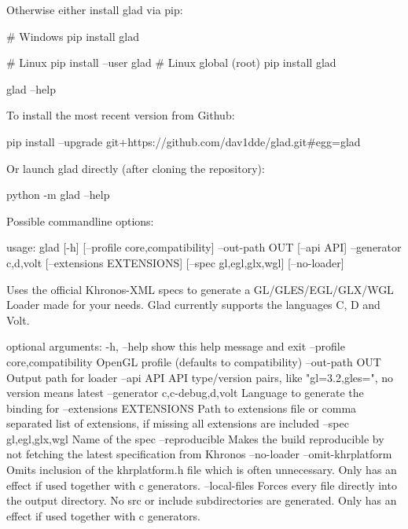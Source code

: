 Otherwise either install glad via pip\+: \begin{DoxyVerb}# Windows
pip install glad

# Linux
pip install --user glad
# Linux global (root)
pip install glad

glad --help
\end{DoxyVerb}


To install the most recent version from Github\+: \begin{DoxyVerb}pip install --upgrade git+https://github.com/dav1dde/glad.git#egg=glad
\end{DoxyVerb}


Or launch glad directly (after cloning the repository)\+: \begin{DoxyVerb}python -m glad --help
\end{DoxyVerb}


Possible commandline options\+: \begin{DoxyVerb}usage: glad [-h] [--profile {core,compatibility}] --out-path OUT
                 [--api API] --generator {c,d,volt}
                 [--extensions EXTENSIONS] [--spec {gl,egl,glx,wgl}]
                 [--no-loader]

Uses the official Khronos-XML specs to generate a GL/GLES/EGL/GLX/WGL Loader
made for your needs. Glad currently supports the languages C, D and Volt.

optional arguments:
  -h, --help            show this help message and exit
  --profile {core,compatibility}
                        OpenGL profile (defaults to compatibility)
  --out-path OUT        Output path for loader
  --api API             API type/version pairs, like "gl=3.2,gles=", no
                        version means latest
  --generator {c,c-debug,d,volt}
                        Language to generate the binding for
  --extensions EXTENSIONS
                        Path to extensions file or comma separated list of
                        extensions, if missing all extensions are included
  --spec {gl,egl,glx,wgl}
                        Name of the spec
  --reproducible        Makes the build reproducible by not fetching 
                        the latest specification from Khronos
  --no-loader
  --omit-khrplatform    Omits inclusion of the khrplatform.h file which is
                        often unnecessary. Only has an effect if used
                        together with c generators.
  --local-files         Forces every file directly into the output directory.
                        No src or include subdirectories are generated. Only
                        has an effect if used together with c generators.
\end{DoxyVerb}



